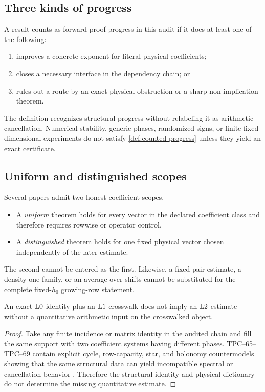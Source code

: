 \subsection{Three kinds of progress}

\begin{definition}
\label{def:counted-progress}
A result counts as forward proof progress in this audit if it does at least
one of the following:
\begin{enumerate}[label=\textup{(\roman*)},leftmargin=3em]
 \item improves a concrete exponent for literal physical coefficients;
 \item closes a necessary interface in the dependency chain; or
 \item rules out a route by an exact physical obstruction or a sharp
       non-implication theorem.
\end{enumerate}
\end{definition}

The definition recognizes structural progress without relabeling it as
arithmetic cancellation.  Numerical stability, generic phases, randomized
signs, or finite fixed-dimensional experiments do not satisfy
\cref{def:counted-progress} unless they yield an exact certificate.

\subsection{Uniform and distinguished scopes}

Several papers admit two honest coefficient scopes.
\begin{itemize}
 \item A \emph{uniform} theorem holds for every vector in the declared
       coefficient class and therefore requires rowwise or operator
       control.
 \item A \emph{distinguished} theorem holds for one fixed physical vector
       chosen independently of the later estimate.
\end{itemize}
The second cannot be entered as the first.  Likewise, a fixed-pair estimate,
a density-one family, or an average over shifts cannot be substituted for
the complete fixed-\(h_0\) growing-row statement.

\begin{proposition}
\label{prop:audit-monotonicity}
An exact \(\mathrm{L0}\) identity plus an \(\mathrm{L1}\) crosswalk does not imply an
\(\mathrm{L2}\) estimate without a quantitative arithmetic input on the crosswalked
object.
\end{proposition}

\begin{proof}
Take any finite incidence or matrix identity in the audited chain and fill
the same support with two coefficient systems having different phases.
TPC--65--TPC--69 contain explicit cycle, row-capacity, star, and holonomy
countermodels showing that the same structural data can yield incompatible
spectral or cancellation behavior
\citep{WangTPC65,WangTPC66,WangTPC67,WangTPC68,WangTPC69}.
Therefore the structural identity and physical dictionary do not determine
the missing quantitative estimate.
\end{proof}
